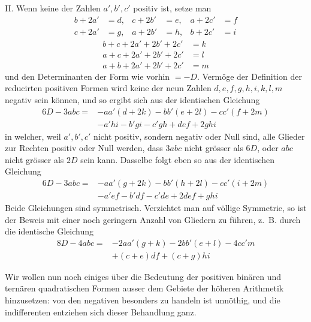 II. Wenn keine der Zahlen $a',b',c'$ positiv ist, setze man
\[
\begin{aligned}
b+2a'&=d,&c+2b'&=e,&a+2c'&=f\\
c+2a'&=g,&a+2b'&=h,&b+2c'&=i
\end{aligned}
\]
\[
\begin{aligned}
b+c+2a'+2b'+2c'&=k\\
a+c+2a'+2b'+2c'&=l\\
a+b+2a'+2b'+2c'&=m
\end{aligned}
\]
und den Determinanten der Form wie vorhin $=-D$. Vermöge der Definition der reducirten positiven Formen wird keine der neun Zahlen $d,\allowbreak e,\allowbreak f,\allowbreak g,\allowbreak h,\allowbreak i,\allowbreak k,\allowbreak l,\allowbreak m$ negativ sein können, und so ergibt sich aus der identischen Gleichung
\[
\begin{aligned}
6D-3abc={}&-aa'(d+2k)-bb'(e+2l)-cc'(f+2m)\\
&-a'hi-b'gi-c'gh+def+2ghi
\end{aligned}
\]
in welcher, weil $a',b',c'$ nicht positiv, sondern negativ oder Null sind, alle Glieder zur Rechten positiv oder Null werden, dass $3abc$ nicht grösser als $6D$, oder $abc$ nicht grösser als $2D$ sein kann. Dasselbe folgt eben so aus der identischen Gleichung
\[
\begin{aligned}
6D-3abc={}&-aa'(g+2k)-bb'(h+2l)-cc'(i+2m)\\
&-a'ef-b'df-c'de+2def+ghi
\end{aligned}
\]
Beide Gleichungen sind symmetrisch. Verzichtet man auf völlige Symmetrie, so ist der Beweis mit einer noch geringern Anzahl von Gliedern zu führen, z.~B. durch die identische Gleichung
\[
\begin{aligned}
8D-4abc={}&-2aa'(g+k)-2bb'(e+l)-4cc'm\\
&+(c+e)df+(c+g)hi
\end{aligned}
\]

Wir wollen nun noch einiges über die Bedeutung der positiven binären und ternären quadratischen Formen ausser dem Gebiete der höheren Arithmetik hinzusetzen: von den negativen besonders zu handeln ist unnöthig, und die indifferenten entziehen sich dieser Behandlung ganz.


